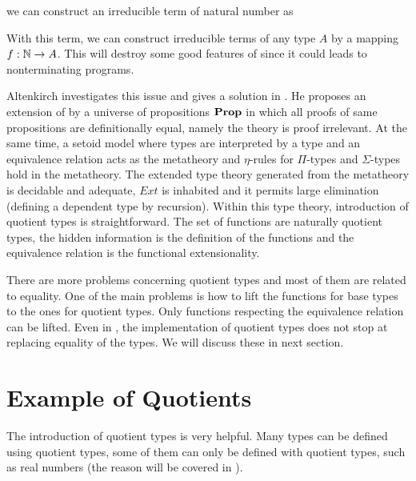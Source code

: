 
we can construct an irreducible term of natural number as



With this term, we can construct irreducible terms of any type $A$ by a
mapping $f : \mathbb{N} \rightarrow A$. This will destroy some good features of \itt
since it could leads to nonterminating programs.

Altenkirch investigates this issue and gives a solution in
\cite{alti:lics99}. He proposes an extension of \itt by a universe of
propositions $\operatorname{\mathbf{Prop}}$ in which all proofs of same propositions are
definitionally equal, namely the theory is proof irrelevant. At the same time,
a setoid model where types are interpreted by a type and an equivalence relation acts as the metatheory and $\eta$-rules for
$\Pi$-types and $\Sigma$-types hold in the metatheory. The extended type
theory generated from the metatheory is decidable and adequate, $Ext$ is
inhabited and it permits large elimination (defining a dependent type by recursion). Within this type theory,
introduction of quotient types is straightforward. 
The set of functions are naturally quotient types, the hidden information is the
definition of the functions and the equivalence relation is the
functional extensionality.

There are more problems concerning quotient types and most
of them are related to equality. One of the main problems is how to lift the functions for
base types to the ones for quotient types. Only functions respecting the
equivalence relation can be lifted. Even in \ett, the implementation
of quotient types does not stop at replacing equality of the types. We
will discuss these in next section.



\section{Example of Quotients}

The introduction of quotient types is very helpful. Many types can be
defined using quotient types, some of them can only be defined with quotient types, such as real
numbers (the reason will be covered in ).




